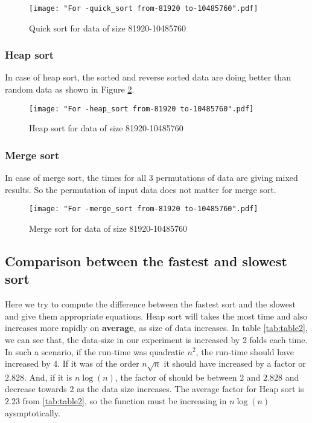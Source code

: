 \documentclass[sigconf, nonacm, natbib, screen, balance=False]{acmart}
\begin{document}
\begin{figure}[ht]
\texttt{[image: "For -quick\_sort from-81920 to-10485760".pdf]}
    \caption{Quick sort for data of size 81920-10485760 }
    \label{fig:quicksort}
\end{figure}

\subsubsection{Heap sort}
In case of heap sort, the sorted and reverse sorted data are doing better than random data as shown in Figure \ref{fig:heapsort}.
\begin{figure}[ht]
\texttt{[image: "For -heap\_sort from-81920 to-10485760".pdf]}
    \caption{Heap sort for data of size 81920-10485760 }
    \label{fig:heapsort}
\end{figure}

\subsubsection{Merge sort}
In case of merge sort, the times for all 3 permutations of data are giving mixed results. So the permutation of input data does not matter for merge sort.

\begin{figure}[ht]
\texttt{[image: "For -merge\_sort from-81920 to-10485760".pdf]}
    \caption{Merge sort for data of size 81920-10485760 }
    \label{fig:mergesort}
\end{figure}


\subsection{Comparison between the fastest and slowest sort}\label{math}
Here we try to compute the difference between the fastest sort and the slowest and give them appropriate equations. Heap sort will takes the most time and also increases more rapidly on \textbf{average}, as size of data increases. In table \ref{tab:table2}, we can see that, the data-size in our experiment is increased by 2 folds each time. In such a scenario, if the run-time was quadratic $n^2$, the run-time should have increased by 4. If it was of the order $n\sqrt{n}$ it should have increased by a factor or $2.828$. And, if it is $n\log(n)$, the factor of should be between $2$ and $2.828$ and decrease towards 2 as the data size increases. The average factor for Heap sort is $2.23$ from \ref{tab:table2}, so the function must be increasing in $n\log(n)$ aysmptotically. 
\end{document}
